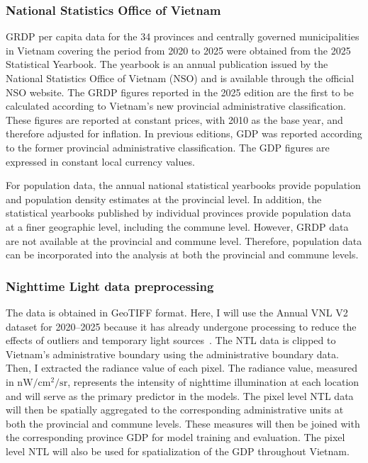 \documentclass[11pt]{article} %
\begin{document}
\subsubsection{National Statistics Office of Vietnam}

GRDP per capita data for the 34 provinces and centrally governed municipalities in Vietnam covering the period from 2020 to 2025 were obtained from the 2025 Statistical Yearbook. The yearbook is an annual publication issued by the National Statistics Office of Vietnam (NSO) and is available through the official NSO website. The GRDP figures reported in the 2025 edition are the first to be calculated according to Vietnam's new provincial administrative classification. These figures are reported at constant prices, with 2010 as the base year, and therefore adjusted for inflation. In previous editions, GDP was reported according to the former provincial administrative classification. The GDP figures are expressed in constant local currency values.

For population data, the annual national statistical yearbooks provide population and population density estimates at the provincial level. In addition, the statistical yearbooks published by individual provinces provide population data at a finer geographic level, including the commune level. However, GRDP data are not available at the provincial and commune level. Therefore, population data can be incorporated into the analysis at both the provincial and commune levels.

\subsubsection{Nighttime Light data preprocessing}

The data is obtained in GeoTIFF format. Here, I will use the Annual VNL V2 dataset for 2020--2025 because it has already undergone processing to reduce the effects of outliers and temporary light sources~\parencite{elv-zhi-gho:VIIRS-2012-2019}. The NTL data is clipped to Vietnam's administrative boundary using the administrative boundary data. Then, I extracted the radiance value of each pixel. The radiance value, measured in $\text{nW}/\text{cm}^2/\text{sr}$, represents the intensity of nighttime illumination at each location and will serve as the primary predictor in the models. The pixel level NTL data will then be spatially aggregated to the corresponding administrative units at both the provincial and commune levels. These measures will then be joined with the corresponding province GDP for model training and evaluation. The pixel level NTL will also be used for spatialization of the GDP throughout Vietnam.
\end{document}
